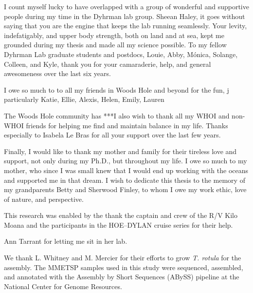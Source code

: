 {I count myself lucky to have overlapped with a group of wonderful and supportive people during my time in the Dyhrman lab group. Sheean Haley, it goes without saying that you are the engine that keeps the lab running seamlessly. Your levity, indefatigably, and upper body strength, both on land and at sea, kept me grounded during my thesis and made all my science possible. To my fellow Dyhrman Lab graduate students and postdocs, Louie, Abby, M\'{o}nica, Solange, Colleen, and Kyle, thank you for your camaraderie, help, and general awesomeness over the last six years. \par
I owe so much to to all my friends in Woods Hole and beyond for the fun, j particularly Katie, Ellie, Alexis, Helen, Emily, Lauren

The Woods Hole community has  ***I also wish to thank all my WHOI and non-WHOI friends for helping me find and maintain balance in my life. Thanks especially to Isabela Le Bras for all your support over the last few years.\par 
Finally, I would like to thank my mother and family for their tireless love and support, not only during my Ph.D., but throughout my life. I owe so much to my mother, who since I was small knew that I would end up working with the oceans and supported me in that dream. I wish to dedicate this thesis to the memory of my grandparents Betty and Sherwood Finley, to whom I owe my work ethic, love of nature, and perspective.\par 

This research was enabled by the thank the captain and crew of the R/V Kilo Moana and the participants in the HOE–DYLAN cruise series for their help. 


Ann Tarrant for letting me sit in her lab. 


We thank L. Whitney and M. Mercier for their efforts to grow \textit{T. rotula} for the assembly. The MMETSP samples used in this study were sequenced, assembled, and annotated with the Assembly by Short Sequences (ABySS) pipeline at the National Center for Genome Resources. 








}
    
